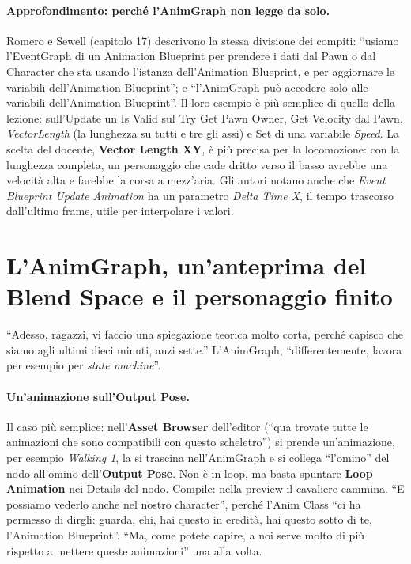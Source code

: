 \paragraph{Approfondimento: perché l'AnimGraph non legge da solo.} Romero e Sewell
(capitolo 17) descrivono la stessa divisione dei compiti: ``usiamo l'EventGraph di un
Animation Blueprint per prendere i dati dal Pawn o dal Character che sta usando l'istanza
dell'Animation Blueprint, e per aggiornare le variabili dell'Animation Blueprint''; e
``l'AnimGraph può accedere solo alle variabili dell'Animation Blueprint''. Il loro esempio
è più semplice di quello della lezione: sull'Update un Is Valid sul Try Get Pawn Owner,
Get Velocity dal Pawn, \emph{VectorLength} (la lunghezza su tutti e tre gli assi) e Set
di una variabile \emph{Speed}. La scelta del docente, \textbf{Vector Length XY}, è più
precisa per la locomozione: con la lunghezza completa, un personaggio che cade dritto
verso il basso avrebbe una velocità alta e farebbe la corsa a mezz'aria. Gli autori
notano anche che \emph{Event Blueprint Update Animation} ha un parametro \emph{Delta Time
X}, il tempo trascorso dall'ultimo frame, utile per interpolare i valori.

\section{L'AnimGraph, un'anteprima del Blend Space e il personaggio finito}
\label{ue8:sec:animgraph}

``Adesso, ragazzi, vi faccio una spiegazione teorica molto corta, perché capisco che siamo
agli ultimi dieci minuti, anzi sette.'' L'AnimGraph, ``differentemente, lavora per
esempio per \emph{state machine}''.

\paragraph{Un'animazione sull'Output Pose.} Il caso più semplice: nell'\textbf{Asset
Browser} dell'editor (``qua trovate tutte le animazioni che sono compatibili con questo
scheletro'') si prende un'animazione, per esempio \emph{Walking 1}, la si trascina
nell'AnimGraph e si collega ``l'omino'' del nodo all'omino dell'\textbf{Output Pose}. Non
è in loop, ma basta spuntare \textbf{Loop Animation} nei Details del nodo. Compile: nella
preview il cavaliere cammina. ``E possiamo vederlo anche nel nostro character'', perché
l'Anim Class ``ci ha permesso di dirgli: guarda, ehi, hai questo in eredità, hai questo
sotto di te, l'Animation Blueprint''. ``Ma, come potete capire, a noi serve molto di più
rispetto a mettere queste animazioni'' una alla volta.

